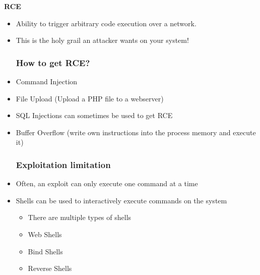 \textbf{RCE}
\begin{itemize}
    \item Ability to trigger arbitrary code execution over a network.
    \item This is the holy grail an attacker wants on your system!
    
    \subsubsection*{How to get RCE?}
    \item Command Injection
    \item File Upload (Upload a PHP file to a webserver)
    \item SQL Injections can sometimes be used to get RCE
    \item Buffer Overflow (write own instructions into the process memory and execute it)
    
    \subsubsection*{Exploitation limitation}
    \item Often, an exploit can only execute one command at a time
    \item Shells can be used to interactively execute commands on the system
    \begin{itemize}
        \tightlist
        \item There are multiple types of shells
        \item Web Shells
        \item Bind Shells
        \item Reverse Shells
    \end{itemize}
\end{itemize}

